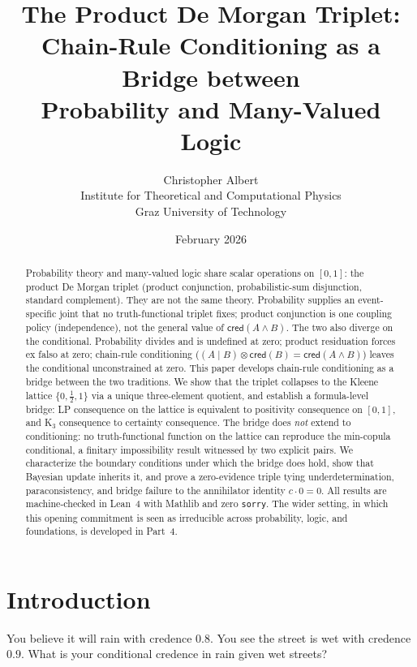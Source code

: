 \documentclass[11pt,a4paper]{article}
\title{The Product De Morgan Triplet:\\
Chain-Rule Conditioning as a Bridge between\\
Probability and Many-Valued Logic}
\author{Christopher Albert\\
\small Institute for Theoretical and Computational Physics\\
\small Graz University of Technology}
\date{February 2026}
\newcommand{\cred}{\mathsf{cred}}
\newcommand{\conjc}{\otimes}
\newcommand{\condc}[2]{({#1} \mid {#2})}
\begin{document}
\maketitle

\begin{abstract}
Probability theory and many-valued logic share scalar operations
on $[0,1]$: the product De Morgan triplet (product conjunction,
probabilistic-sum disjunction, standard complement).
They are not the same theory.  Probability supplies an event-specific
joint that no truth-functional triplet fixes; product conjunction is
one coupling policy (independence), not the general value of
$\cred(A \land B)$.  The two also diverge on the conditional.
Probability divides and is undefined at zero; product residuation
forces ex falso at zero; chain-rule conditioning
($\condc{A}{B} \conjc \cred(B) = \cred(A \land B)$)
leaves the conditional unconstrained at zero.
This paper develops chain-rule conditioning as a bridge
between the two traditions.
We show that the triplet collapses to the Kleene lattice
$\{0, \tfrac{1}{2}, 1\}$ via a unique three-element quotient,
and establish a formula-level bridge: LP consequence on the
lattice is equivalent to positivity consequence on $[0,1]$,
and K$_3$ consequence to certainty consequence.
The bridge does \emph{not} extend to conditioning: no
truth-functional function on the lattice can reproduce the
min-copula conditional, a finitary impossibility result
witnessed by two explicit pairs.
We characterize the boundary conditions under which the bridge
does hold, show that Bayesian update inherits it, and prove
a zero-evidence triple tying underdetermination, paraconsistency,
and bridge failure to the annihilator identity $c \cdot 0 = 0$.
All results are machine-checked in Lean~4 with Mathlib and zero
\texttt{sorry}.
The wider setting, in which this opening commitment is seen as irreducible across probability, logic, and foundations, is developed in Part~4.
\end{abstract}

\section{Introduction}
\label{sec:intro}

You believe it will rain with credence $0.8$.
You see the street is wet with credence $0.9$.
What is your conditional credence in rain given wet streets?
\end{document}
